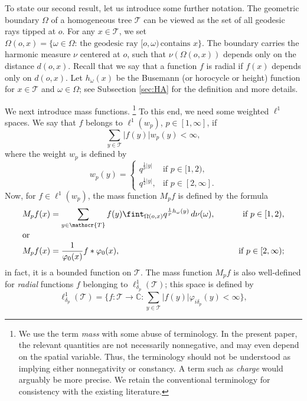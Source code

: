 \documentclass[11pt,a4paper,reqno]{amsart}
\renewcommand\mathcal{\mathscr}
\theoremstyle{plain}
\theoremstyle{remark}
\theoremstyle{definition}
\theoremstyle{remark}
\numberwithin{equation}{section}
\begin{document}
To state our second result, let us introduce some further notation. The geometric boundary $\Omega$ of a homogeneous tree $\mathcal{T}$ can be viewed as the set of all geodesic rays tipped at $o$. For
	any $x \in  \mathcal{T}$, we set $\Omega(o, x)=\{\omega\in \Omega: \, \text{the geodesic ray } [o,\omega) \, \text{contains } x\}$. The boundary 
	carries the harmonic measure $\nu$ centered at $o$, such that $\nu(\Omega(o, x))$ depends only on the distance
	$d(o, x)$. Recall that we say that a function $f$ is radial if $f(x)$ depends only on $d(o, x)$. 
    Let $h_{\omega}(x)$ be the Busemann (or horocycle or height) function for $x \in  \mathcal{T}$ and $\omega \in \Omega$; see Subsection \ref{sec:HA} for the definition and more details.
	
	We next introduce mass functions. \footnote{We use the term \textit{mass} with some abuse of terminology. In the present paper, the relevant quantities are not necessarily nonnegative, and may even depend on the spatial variable. Thus, the terminology should not be understood as implying either nonnegativity or constancy. A term such as \textit{charge}  would arguably be more precise. We retain the conventional terminology for consistency with the existing literature.} To this end, we need some weighted $\ell^1$ spaces. We say that $f$ belongs to $\ell^1(w_p)$,
	$p \in [1, \infty]$, if
	\[
	\sum_{y \in \mathcal{T}} |f(y)| w_p(y) < \infty,
	\]
	where the weight $w_p$ is defined by
	\begin{equation}\label{eq:defwp}
	w_p(y) =
	\begin{cases} q^{\frac{1}{p}|y|}  &\text{if } p \in [1, 2), \\
		q^{\frac{1}{2}|y|} , &\text{if } p \in [2, \infty].
	\end{cases}
	\end{equation}
	Now, for $f \in \ell^1(w_p)$, the mass function $M_pf$ is defined by the formula
	\begin{align*} 
		M_pf(x) &= \sum_{y \in \mathcal{T}} f(y)	
		\fint_{\Omega(o,x)} q^{\frac{1}{p}h_{\omega}(y)}\, d\nu(\omega), \qquad &\text{if } p \in [1, 2), \\
		\intertext{or}
		M_pf(x) &= \frac{1}{\varphi_0(x)} f\ast\varphi_0(x), &\text{if } 
		p \in [2, \infty);  
	\end{align*}
in fact, it is a bounded function on $\mathcal{T}$. The mass function $M_pf$ is also well-defined for \textit{radial} functions $f$ belonging to $ \ell^1_{\delta_p}(\mathcal{T})$; this space is defined by
\begin{equation}\label{eq:defdeltap}		
\ell^1_{\delta_p}(\mathcal{T}) =
		\Big\{f : \mathcal{T} \to \mathbb{C}: \sum_{y \in \mathcal{T}} |f(y)| \varphi_{i\delta_p}(y) < \infty
		\Big\},
	\end{equation}
\end{document}
